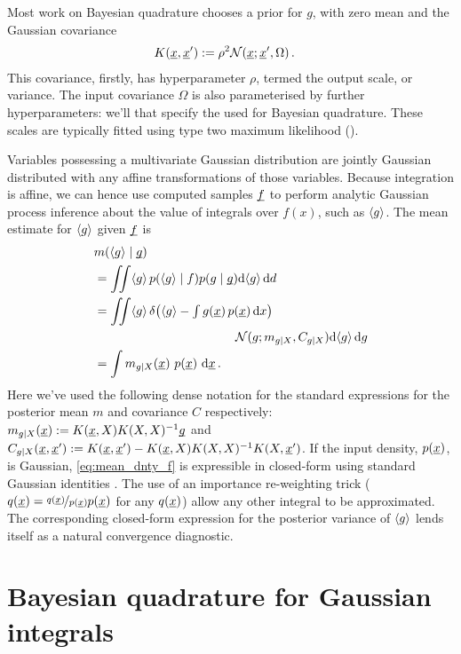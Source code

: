 \documentclass[twoside]{article}
\begin{document}
Most work on Bayesian quadrature chooses a \gp prior for $g$, with zero mean and the Gaussian covariance 
\begin{align} \label{eq:Gaussian_cov_fn}
K(\underline{\smash{x}},\underline{\smash{x}}') & := \rho^2 \mathcal{N}(\underline{\smash{x}};\underline{\smash{x}}',\Omega)\,.
\end{align} 
This covariance, firstly, has hyperparameter $\rho$, 
termed the output scale, or variance. The input covariance $\Omega$ is also parameterised by further hyperparameters: we'll  that specify the  \gp used for Bayesian quadrature. These scales are typically fitted using type two maximum likelihood ().

Variables possessing a multivariate Gaussian distribution are jointly Gaussian distributed with any affine transformations of those variables. Because integration is affine, we can hence use computed samples $\underline{\smash{f}}$ to perform analytic Gaussian process inference about the value of integrals over $f(x)$, such as $\langle g \rangle$. The mean estimate for $\langle g \rangle$ given $\underline{\smash{f}}$ is
%
\begin{align} 
&
\mean{\inty{g}}{\v{g}} 
\nonumber\\
& =\iint \inty{g}\,\p{\inty{g}}{f}\p{g}{\v{g}} \ud \inty{g} \,\ud d                                                                                                                                                               \nonumber\\
&
 =\iint \inty{g}\,\delta\bigl(\inty{g} - {\textstyle\int g(\vx)\,p(\vx)\,\ud x}\bigr)
\nonumber\\
& \hspace{4cm}
\N{g}{m_{g|X}}{C_{g|X}} \ud \inty{g} \,\ud g 
\nonumber\\
&
 = \int m_{g|X}(\vx)~p(\vx)~\ud \vx
\,. \label{eq:mean_dnty_f}
\end{align}
Here we've used the following dense notation for the standard \gp expressions for the posterior mean $m$ and covariance $C$ respectively: 
$m_{g|X}(\underline{\smash{x}}) := K(\underline{\smash{x}}, X) K(X, X)^{-1} \underline{\smash{g}} $ and 
$C_{g|X}(\underline{\smash{x}}, \underline{\smash{x}}') := K(\underline{\smash{x}}, \underline{\smash{x}}') - K(\underline{\smash{x}}, X) K(X, X)^{-1} K(X, \underline{\smash{x}}')$.
If the input density, $p(\underline{\smash{x}})$, is Gaussian, \eqref{eq:mean_dnty_f} is expressible in closed-form using standard Gaussian identities \citep{BZMonteCarlo}.
The use of an importance re-weighting trick ($q(\underline{\smash{x}}) = \nicefrac{q(\underline{\smash{x}})}{p(\underline{\smash{x}})} p(\underline{\smash{x}})$ for any $q(\underline{\smash{x}})$) allow any other integral to be approximated. 
%
The corresponding closed-form expression for the posterior variance of $\langle g \rangle$ lends itself as a natural convergence diagnostic. 

\section{Bayesian quadrature for Gaussian integrals}
\end{document}
